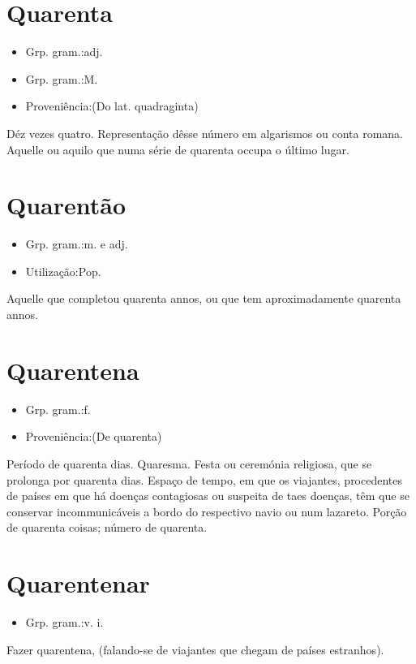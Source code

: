 \section{Quarenta}
\begin{itemize}
\item {Grp. gram.:adj.}
\end{itemize}
\begin{itemize}
\item {Grp. gram.:M.}
\end{itemize}
\begin{itemize}
\item {Proveniência:(Do lat. \textunderscore quadraginta\textunderscore )}
\end{itemize}
Déz vezes quatro.
Representação dêsse número em algarismos ou conta romana.
Aquelle ou aquilo que numa série de quarenta occupa o último lugar.
\section{Quarentão}
\begin{itemize}
\item {Grp. gram.:m.  e  adj.}
\end{itemize}
\begin{itemize}
\item {Utilização:Pop.}
\end{itemize}
Aquelle que completou quarenta annos, ou que tem aproximadamente quarenta annos.
\section{Quarentena}
\begin{itemize}
\item {Grp. gram.:f.}
\end{itemize}
\begin{itemize}
\item {Proveniência:(De \textunderscore quarenta\textunderscore )}
\end{itemize}
Período de quarenta dias.
Quaresma.
Festa ou ceremónia religiosa, que se prolonga por quarenta dias.
Espaço de tempo, em que os viajantes, procedentes de países em que há doenças contagiosas ou suspeita de taes doenças, têm que se conservar incommunicáveis a bordo do respectivo navio ou num lazareto.
Porção de quarenta coisas; número de quarenta.
\section{Quarentenar}
\begin{itemize}
\item {Grp. gram.:v. i.}
\end{itemize}
Fazer quarentena, (falando-se de viajantes que chegam de países estranhos).
